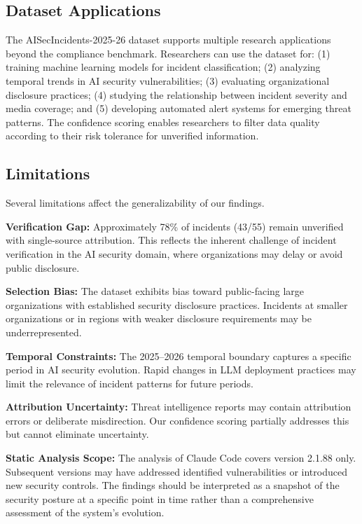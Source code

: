 \documentclass[10pt,conference]{IEEEtran}
\begin{document}
\subsection{Dataset Applications}

The AISecIncidents-2025-26 dataset supports multiple research applications beyond the compliance benchmark. Researchers can use the dataset for: (1) training machine learning models for incident classification; (2) analyzing temporal trends in AI security vulnerabilities; (3) evaluating organizational disclosure practices; (4) studying the relationship between incident severity and media coverage; and (5) developing automated alert systems for emerging threat patterns. The confidence scoring enables researchers to filter data quality according to their risk tolerance for unverified information.

\subsection{Limitations}

Several limitations affect the generalizability of our findings.

\textbf{Verification Gap:} Approximately 78\% of incidents (43/55) remain unverified with single-source attribution. This reflects the inherent challenge of incident verification in the AI security domain, where organizations may delay or avoid public disclosure.

\textbf{Selection Bias:} The dataset exhibits bias toward public-facing large organizations with established security disclosure practices. Incidents at smaller organizations or in regions with weaker disclosure requirements may be underrepresented.

\textbf{Temporal Constraints:} The 2025--2026 temporal boundary captures a specific period in AI security evolution. Rapid changes in LLM deployment practices may limit the relevance of incident patterns for future periods.

\textbf{Attribution Uncertainty:} Threat intelligence reports may contain attribution errors or deliberate misdirection. Our confidence scoring partially addresses this but cannot eliminate uncertainty.

\textbf{Static Analysis Scope:} The analysis of Claude Code covers version 2.1.88 only. Subsequent versions may have addressed identified vulnerabilities or introduced new security controls. The findings should be interpreted as a snapshot of the security posture at a specific point in time rather than a comprehensive assessment of the system's evolution.
\end{document}
